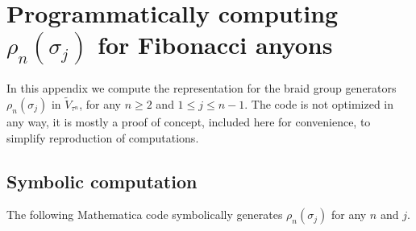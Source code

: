 
\chapter{Programmatically computing \texorpdfstring{$\rho_n(\sigma_j)$}{ρₙ(σⱼ)} for Fibonacci anyons}\label{sec:code}

In this appendix we compute the representation for the braid group generators $ρ_n(σ_j)$ in $\widetilde{V}_{τ^n}$, for any $n \ge 2$ and $1 \le j \le n-1$. The code is not optimized in any way, it is mostly a proof of concept, included here for convenience, to simplify reproduction of computations.

\section{Symbolic computation}

The following Mathematica code symbolically generates $ρ_n(σ_j)$ for any $n$ and $j$.

